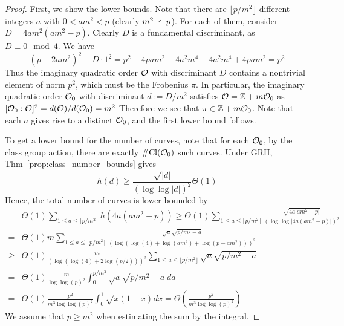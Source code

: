 \begin{proof}
    First, we show the lower bounds.
    Note that there are $\lfloor p/m^2 \rfloor$ different integers $a$ with $0 < am^2 < p$ (clearly $m^2 \ \nmid \  p$).
    For each of them, consider $D = 4am^2(am^2 - p)$.
    Clearly $D$ is a fundamental discriminant, as $D \equiv 0 \mod 4$.
    We have
    \begin{equation*}
        (p - 2am^2)^2 - D \cdot 1^2 = p^2 - 4pam^2 + 4a^2m^4 - 4a^2m^4 + 4pam^2 = p^2
    \end{equation*}
    Thus the imaginary quadratic order $\mathcal{O}$ with discriminant $D$ contains a nontrivial element of norm $p^2$, which must be the Frobenius $\pi$.
    In particular, the imaginary quadratic order $\mathcal{O}_0$ with discriminant $d := D/m^2$ satisfies $\mathcal{O} = \mathbb{Z} + m\mathcal{O}_0$ as $[\mathcal{O}_0 : \mathcal{O}]^2 = d(\mathcal{O})/d(\mathcal{O}_0) = m^2$
    Therefore we see that $\pi \in \mathbb{Z} + m\mathcal{O}_0$.
    Note that each $a$ gives rise to a distinct $\mathcal{O}_0$, and the first lower bound follows.

    To get a lower bound for the number of curves, note that for each $\mathcal{O}_0$, by the class group action, there are exactly $\#\mathrm{Cl}(\mathcal{O}_0)$ such curves.
    Under GRH, Thm~\ref{prop:class_number_bounds} gives
    \begin{equation*}
        h(d) \geq \frac {\sqrt{|d|}} {(\log\log|d|)^2} \Theta(1)
    \end{equation*}
    Hence, the total number of curves is lower bounded by
    \begin{align*}
        &\Theta(1) \sum_{1 \leq a \leq \lfloor p/m^2 \rfloor} h(4a(am^2 - p)) \geq \Theta(1) \sum_{1 \leq a \leq \lfloor p/m^2 \rceil} \frac {\sqrt{4a|am^2 - p|}} {(\log\log|4a(am^2 - p)|)^2} \\
        =& \Theta(1) m \sum_{1 \leq a \leq \lfloor p/m^2 \rfloor} \frac {\sqrt{a} \sqrt{p/m^2 - a}} {(\log(\log(4) + \log(am^2) + \log(p - am^2)))^2} \\
        \geq& \Theta(1) \frac {m} {(\log(\log(4) + 2\log(p/2)))^2} \sum_{1 \leq a \leq \lfloor p/m^2 \rfloor} \sqrt{a} \sqrt{p/m^2 - a} \\
        =& \Theta(1) \frac {m} {\log\log(p)^2} \int_0^{p/m^2} \sqrt{a} \sqrt{p/m^2 - a} \ da \\
        =& \Theta(1) \frac {p^2} {m^3 \log\log(p)^2} \int_0^1 \sqrt{x(1 - x)} dx = \Theta\left( \frac {p^2} {m^3 \log\log(p)^2} \right)
    \end{align*}
    We assume that $p \geq m^2$ when estimating the sum by the integral.


\end{proof}
